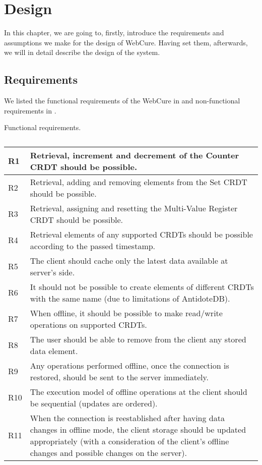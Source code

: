 \chapter{Design}
\label{Design}

In this chapter, we are going to, firstly, introduce the requirements and assumptions we make for the design of WebCure. Having set them, afterwards, we will in detail describe the design of the system.

\section{Requirements}
\label{4-Requirements}

We listed the functional requirements of the WebCure in  and non-functional requirements in .

\begin{table}[!htbp]
\centering
\caption{Functional requirements.}
\label{table:req1}
\begin{tabular}{|p{1cm}|p{14cm}|}
\hline
R1 & Retrieval, increment and decrement of the Counter CRDT should be possible.                         \\ \hline
R2 & Retrieval, adding and removing elements from the Set CRDT should be possible.                       \\ \hline
R3 & Retrieval, assigning and resetting the Multi-Value Register CRDT should be possible.               \\ \hline
R4 & Retrieval elements of any supported CRDTs should be possible according to the passed timestamp. \\ \hline
R5 & The client should cache only the latest data available at server's side. \\ \hline
R6 & It should not be possible to create elements of different CRDTs with the same name (due to limitations of AntidoteDB). \\ \hline
R7 & When offline, it should be possible to make read/write operations on supported CRDTs. \\ \hline
R8 & The user should be able to remove from the client any stored data element. \\ \hline
R9 & Any operations performed offline, once the connection is restored, should be sent to the server immediately. \\ \hline
R10 & The execution model of offline operations at the client should be sequential (updates are ordered). \\ \hline 
R11 & When the connection is reestablished after having data changes in offline mode, the client storage should be updated appropriately (with a consideration of the client's offline changes and possible changes on the server). \\ \hline
\end{tabular}
\caption*{}
\end{table}

